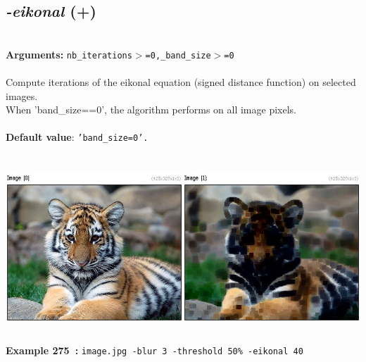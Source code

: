 \documentclass[a4paper,11pt,twoside]{book}
\begin{document}
\subsection{\emph{-eikonal} (+)}\vspace*{-0.5em}
~\\\textbf{Arguments: } 
{\small \texttt{nb\_iterations$>$=0,\_band\_size$>$=0}}\\~\\
Compute iterations of the eikonal equation (signed distance function) on selected images.
~\\When 'band\_size==0', the algorithm performs on all image pixels.
~\\~\\\textbf{Default value}: {\small \texttt{'band\_size=0'.}}
\begin{center}\includegraphics[keepaspectratio=true,height=7cm,width=\textwidth]{img/gmic_def275.jpg}\\
{\footnotesize \textbf{Example 275~:} \texttt{image.jpg -blur 3 -threshold 50\% -eikonal 40}}
\end{center}
\end{document}
